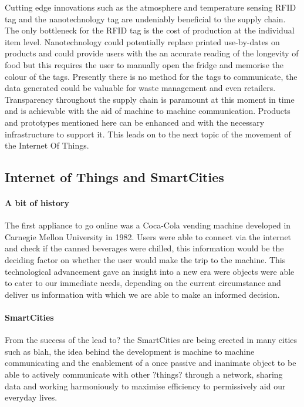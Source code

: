 \documentclass[a4paper, 11pt]{article}
\begin{document}
Cutting edge innovations such as the atmosphere and temperature sensing RFID tag and the nanotechnology tag are undeniably beneficial to the supply chain. The only bottleneck for the RFID  tag is the cost of production at the individual item level. Nanotechnology could potentially replace printed use-by-dates on products  and could provide users with the an accurate reading of the longevity of food but this requires the user to manually open the fridge and memorise the colour of the tags. Presently there is no method for the tags to communicate, the data generated could be valuable for waste management and even retailers. Transparency throughout the supply chain is paramount at this moment in time and is achievable with the aid of machine to machine communication. Products and prototypes mentioned here can be enhanced and with the necessary infrastructure to support it. This leads on to the next topic of the movement of the Internet Of Things.


\vspace{\baselineskip}
\vspace{\baselineskip}
\vspace{\baselineskip}


\subsection{Internet of Things and SmartCities}
\paragraph{A bit of history} The first appliance to go online was a Coca-Cola vending machine developed in Carnegie Mellon University in 1982. Users were able to connect via the internet and check if the canned beverages were chilled, this information would be the deciding factor on whether the user would make the trip to the machine. This technological advancement gave an insight into a new era were objects were able to cater to our immediate needs, depending on the current circumstance and deliver us information with which we are able to make an informed decision.

\paragraph{SmartCities} From the success of the lead to?  the SmartCities are being erected in many cities such as blah, the idea behind the development is machine to machine communicating and the enablement of a once passive and inanimate object to be able to actively communicate with other ?things? through a network, sharing data and working harmoniously to maximise efficiency to permissively aid our everyday lives. 
\end{document}
